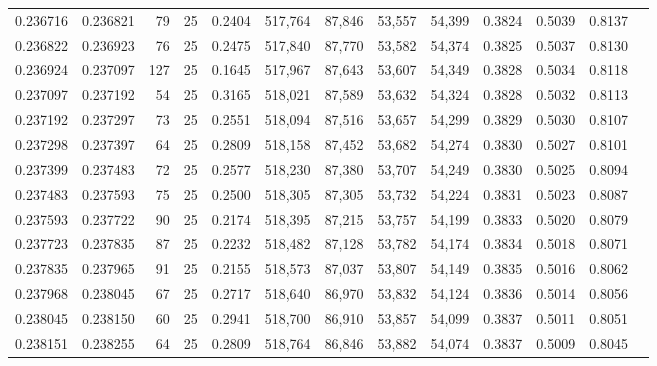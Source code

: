 \begin{tabular}{rrrrrrrrrrrrr}
0.236716 & 0.236821 &    79 &  25 &                                     0.2404 & 517,764 &  87,846 &  53,557 &  54,399 & 0.3824 & 0.5039 & 0.8137 \\
0.236822 & 0.236923 &    76 &  25 &                                     0.2475 & 517,840 &  87,770 &  53,582 &  54,374 & 0.3825 & 0.5037 & 0.8130 \\
0.236924 & 0.237097 &   127 &  25 &                                     0.1645 & 517,967 &  87,643 &  53,607 &  54,349 & 0.3828 & 0.5034 & 0.8118 \\
0.237097 & 0.237192 &    54 &  25 &                                     0.3165 & 518,021 &  87,589 &  53,632 &  54,324 & 0.3828 & 0.5032 & 0.8113 \\
0.237192 & 0.237297 &    73 &  25 &                                     0.2551 & 518,094 &  87,516 &  53,657 &  54,299 & 0.3829 & 0.5030 & 0.8107 \\
0.237298 & 0.237397 &    64 &  25 &                                     0.2809 & 518,158 &  87,452 &  53,682 &  54,274 & 0.3830 & 0.5027 & 0.8101 \\
0.237399 & 0.237483 &    72 &  25 &                                     0.2577 & 518,230 &  87,380 &  53,707 &  54,249 & 0.3830 & 0.5025 & 0.8094 \\
0.237483 & 0.237593 &    75 &  25 &                                     0.2500 & 518,305 &  87,305 &  53,732 &  54,224 & 0.3831 & 0.5023 & 0.8087 \\
0.237593 & 0.237722 &    90 &  25 &                                     0.2174 & 518,395 &  87,215 &  53,757 &  54,199 & 0.3833 & 0.5020 & 0.8079 \\
0.237723 & 0.237835 &    87 &  25 &                                     0.2232 & 518,482 &  87,128 &  53,782 &  54,174 & 0.3834 & 0.5018 & 0.8071 \\
0.237835 & 0.237965 &    91 &  25 &                                     0.2155 & 518,573 &  87,037 &  53,807 &  54,149 & 0.3835 & 0.5016 & 0.8062 \\
0.237968 & 0.238045 &    67 &  25 &                                     0.2717 & 518,640 &  86,970 &  53,832 &  54,124 & 0.3836 & 0.5014 & 0.8056 \\
0.238045 & 0.238150 &    60 &  25 &                                     0.2941 & 518,700 &  86,910 &  53,857 &  54,099 & 0.3837 & 0.5011 & 0.8051 \\
0.238151 & 0.238255 &    64 &  25 &                                     0.2809 & 518,764 &  86,846 &  53,882 &  54,074 & 0.3837 & 0.5009 & 0.8045 \\

\end{tabular}
